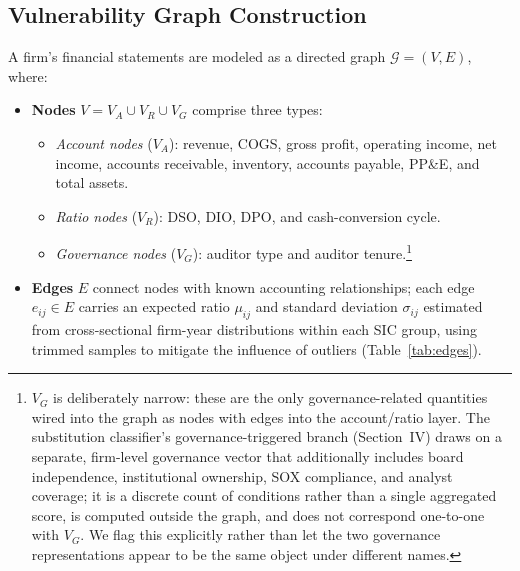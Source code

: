 \documentclass[12pt]{article}
\begin{document}
\subsection*{Vulnerability Graph Construction}
\label{subsec:graph}

A firm's financial statements are modeled as a directed graph
$\mathcal{G} = (V, E)$, where:

\begin{itemize}
    \item \textbf{Nodes} $V = V_A \cup V_R \cup V_G$ comprise three types:
    \begin{itemize}
        \item \emph{Account nodes} ($V_A$): revenue, COGS, gross profit,
              operating income, net income, accounts receivable, inventory,
              accounts payable, PP\&E, and total assets.
        \item \emph{Ratio nodes} ($V_R$): DSO, DIO, DPO, and cash-conversion cycle.
        \item \emph{Governance nodes} ($V_G$): auditor type and auditor
              tenure.\footnote{$V_G$ is deliberately narrow: these are the
              only governance-related quantities wired into the graph as
              nodes with edges into the account/ratio layer. The substitution
              classifier's governance-triggered branch (Section~IV) draws on a
              separate, firm-level governance vector that additionally
              includes board independence, institutional ownership, SOX
              compliance, and analyst coverage; it is a discrete count of
              conditions rather than a single aggregated score, is computed
              outside the graph, and does not correspond one-to-one with
              $V_G$. We flag this explicitly
              rather than let the two governance representations appear
              to be the same object under different names.}
    \end{itemize}
    \item \textbf{Edges} $E$ connect nodes with known accounting relationships;
    each edge $e_{ij} \in E$ carries an expected ratio $\mu_{ij}$ and standard
    deviation $\sigma_{ij}$ estimated from cross-sectional firm-year
    distributions within each SIC group, using trimmed samples to mitigate
    the influence of outliers (Table~\ref{tab:edges}).
\end{itemize}
\end{document}
